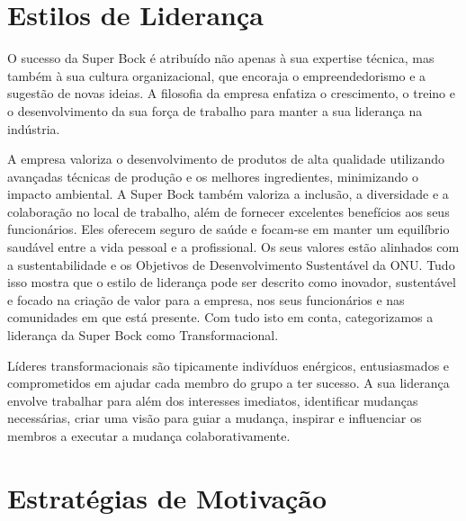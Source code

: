 \section{Estilos de Liderança}

O sucesso da Super Bock é atribuído não apenas à sua expertise técnica, mas também à sua cultura organizacional, que encoraja o empreendedorismo e a sugestão de novas ideias. A filosofia da empresa enfatiza o crescimento, o treino e o desenvolvimento da sua força de trabalho para manter a sua liderança na indústria.

A empresa valoriza o desenvolvimento de produtos de alta qualidade utilizando avançadas técnicas de produção e os melhores ingredientes, minimizando o impacto ambiental. A Super Bock também valoriza a inclusão, a diversidade e a colaboração no local de trabalho, além de fornecer excelentes benefícios aos seus funcionários. Eles oferecem seguro de saúde e focam-se em manter um equilíbrio saudável entre a vida pessoal e a profissional. Os seus valores estão alinhados com a sustentabilidade e os Objetivos de Desenvolvimento Sustentável da ONU. Tudo isso mostra que o estilo de liderança pode ser descrito como inovador, sustentável e focado na criação de valor para a empresa, nos seus funcionários e nas comunidades em que está presente. Com tudo isto em conta, categorizamos a liderança da Super Bock como Transformacional.

Líderes transformacionais são tipicamente indivíduos enérgicos, entusiasmados e comprometidos em ajudar cada membro do grupo a ter sucesso. A sua liderança envolve trabalhar para além dos interesses imediatos, identificar mudanças necessárias, criar uma visão para guiar a mudança, inspirar e influenciar os membros a executar a mudança colaborativamente.

\section{Estratégias de Motivação}
